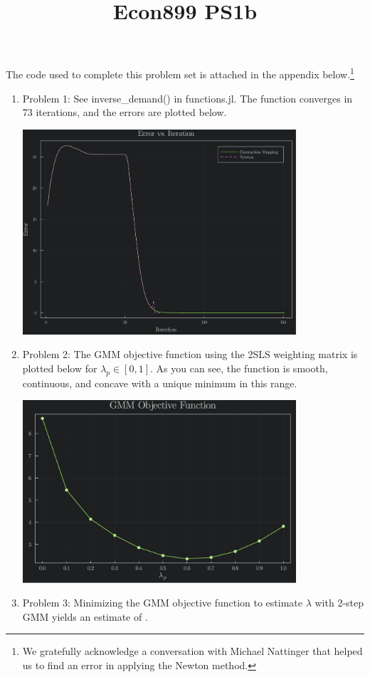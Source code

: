 \documentclass[landscape]{article} %
\title{Econ899 PS1b}
\theoremstyle{definition}
\begin{document}
The code used to complete this problem set is attached in the appendix below.\footnote{We gratefully acknowledge a conversation with Michael Nattinger that helped us to find an error in applying the Newton method.}
\begin{enumerate}
	\item Problem 1: See inverse\_demand() in functions.jl. The function converges in 73 iterations, and the errors are plotted below.
		\begin{center}
			\includegraphics[width=0.8\textwidth]{figures/Problem1.pdf}
		\end{center}

	\item Problem 2: The GMM objective function using the 2SLS weighting matrix is plotted below for $\lambda_p\in[0, 1]$. As you can see, the function is smooth, continuous, and concave with a unique minimum in this range.
		\begin{center}
			\includegraphics[width=0.8\textwidth]{figures/Problem2.pdf}
		\end{center}

	\item Problem 3: Minimizing the GMM objective function to estimate $\lambda$ with 2-step GMM yields an estimate of .
\end{enumerate}
\end{document}
